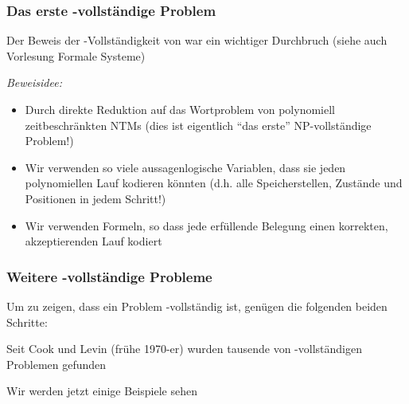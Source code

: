 \documentclass[onlymath]{beamer}
\begin{document}
\begin{frame}\frametitle{Das erste -vollständige Problem}

Der Beweis der -Vollständigkeit von  war ein wichtiger Durchbruch (siehe auch Vorlesung Formale Systeme)
\bigskip

\emph{Beweisidee:}
\begin{itemize}
\item Durch direkte Reduktion auf das Wortproblem von polynomiell zeitbeschränkten NTMs
{\tiny(dies ist eigentlich "`das erste"' NP-vollständige Problem!)}
\item Wir verwenden so viele aussagenlogische Variablen, dass sie jeden polynomiellen
Lauf kodieren könnten (d.h. alle Speicherstellen, Zustände und Positionen in jedem Schritt!)
\item Wir verwenden Formeln, so dass jede erfüllende Belegung einen korrekten, akzeptierenden Lauf kodiert
\end{itemize}\medskip\pause


\end{frame}

\begin{frame}\frametitle{Weitere -vollständige Probleme}

Um zu zeigen, dass ein Problem  -vollständig ist, genügen 
die folgenden beiden Schritte:\medskip


Seit Cook und Levin (frühe 1970-er) wurden tausende von -vollständigen Problemen gefunden
\bigskip

Wir werden jetzt einige Beispiele sehen

\end{frame}
\end{document}
